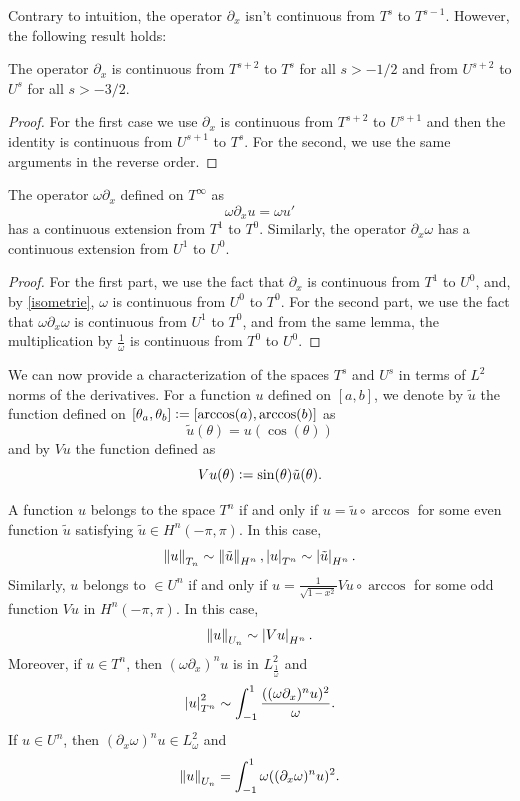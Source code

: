 \documentclass[a4paper]{article}
\begin{document}
Contrary to intuition, the operator $\partial_x$ isn't continuous from $T^s$ to $T^{s-1}$. However, the following result holds:
\begin{Cor}
	\label{corDxT2T0}
	The operator $\partial_x$ is continuous from $T^{s+2}$ to $T^s$ for all $s > -1/2 $ and from $U^{s+2}$ to $U^s$ for all $s > - 3/2$.
\end{Cor}
\begin{proof}
	For the first case we use $\partial_x$ is continuous from $T^{s+2}$ to $U^{s+1}$ and then the identity is continuous from $U^{s+1}$ to $T^s$. For the second, we use the same arguments in the reverse order. 
\end{proof}
\begin{Lem}
	\label{omegadxetdxomga}
	The operator $\omega \partial_x$ defined on $T^{\infty}$ as 
	\[\omega \partial_x u = \omega u'\]
	has a continuous extension from $T^1$ to $T^0$. Similarly, the operator $\partial_x \omega$ has a continuous extension from $U^1$ to $U^0$. 
\end{Lem}
\begin{proof}
	For the first part, we use the fact that $\partial_x$ is continuous from $T^1$ to $U^0$, and, by \autoref{isometrie}, $\omega$ is continuous from $U^0$ to $T^0$. 
	For the second part, we use the fact that $\omega \partial_x \omega$ is continuous from $U^1$ to $T^0$, and from the same lemma, the multiplication by $\frac{1}{\omega}$ is continuous from $T^0$ to $U^0$. 
\end{proof}
We can now provide a characterization of the spaces $T^s$ and $U^s$ in terms of $L^2$ norms of the derivatives. For a function $u$ defined on $[a,b]$, we denote by $\tilde{u}$ the function defined on $[\theta_a,\theta_b] \mathrel{\mathop:}= [\arccos(a),\arccos(b)]$ as
\[ \tilde{u}(\theta) = u(\cos(\theta))\]
and by $Vu$ the function defined as 
\[Vu(\theta) \mathrel{\mathop:}= \sin(\theta) \tilde{u}(\theta).\]
\begin{Lem}
	A function $u$ belongs to the space $T^n$ if and only if $u = \tilde{u} \circ \arccos$ for some even function $\tilde{u}$ satisfying $\tilde{u}\in H^n(-\pi,\pi)$. In this case, 
	\[ \left\|u\right\|_{T_n}\sim \left\|\tilde{u}\right\|_{H^n}, \left\lvert u \right\rvert_{T^n} \sim \left\lvert \tilde{u} \right\rvert_{H^n}.\]
	Similarly, $u$ belongs to  $\in U^n$ if and only if $ u = \frac{1}{\sqrt{1 - x^2}} Vu  \circ  \arccos$  for some odd function $Vu$ in  $H^n(-\pi,\pi)$. In this case, 
	\[\left\|u\right\|_{U_n} \sim \left\lvert Vu \right\rvert_{H^n}.\]	
	Moreover, if $ u \in T^n$, then $(\omega \partial_x)^n u$ is in $L^2_\frac{1}{\omega}$ and 
	\[ \left\lvert u \right\rvert_{T^n}^2 \sim \int_{-1}^{1} \frac{((\omega \partial_x)^n u)^2}{\omega}.\]
	\noindent If $u \in U^n$, then $(\partial_x \omega)^n u \in L^2_\omega$ and 
	\[ \left\|u\right\|_{U_n} = \int_{-1}^{1}\omega ((\partial_x \omega)^n u)^2.\]
	\label{thmChar}
\end{Lem}
\end{document}
